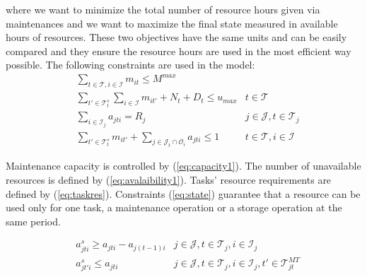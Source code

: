 \documentclass[a4paper,onecolumn,fleqn]{article}
\begin{document}
    where we want to minimize the total number of resource hours given via maintenances and we want to maximize the final state measured in available hours of resources. These two objectives have the same units and can be easily compared and they ensure the resource hours are used in the most efficient way possible.
    The following constraints are used in the model:       
    \begin{align}
        & \sum_{t \in \mathcal{T}, i \in \mathcal{I}} m_{it} \leq M^{max} \label{eq:capacity1}\\
       & \sum_{t' \in \mathcal{T}^{s}_t} \sum_{i \in \mathcal{I}} m_{it'} + N_t + D_t\leq u_{max} 
        &t \in \mathcal{T} \label{eq:avalaibility1}\\
        & \sum_{i \in \mathcal{I}_j} a_{jti} = R_j
                & j \in \mathcal{J}, t \in \mathcal{T}_j  \label{eq:taskres}\\
        & \sum_{t' \in \mathcal{T}^{s}_t} m_{it'} + \sum_{j \in \mathcal{J}_t \cap \mathcal{O}_i} a_{jti} \leq 1 
                & t \in \mathcal{T}, i \in \mathcal{I} \label{eq:state}
    \end{align}


    Maintenance capacity is controlled by (\ref{eq:capacity1}). The number of unavailable resources is defined by (\ref{eq:avalaibility1}). Tasks' resource requirements are defined by (\ref{eq:taskres}). Constraints (\ref{eq:state}) guarantee that a resource can be used only for one task, a maintenance operation or a storage operation at the same period.  

    \begin{align}
        & a^s_{jti} \geq a_{jti} - a_{j(t-1)i} 
                & j \in \mathcal{J}, t \in \mathcal{T}_j, i \in \mathcal{I}_j \label{eq:start1} \\
        & a^s_{jt'i} \leq a_{jti}
        & j \in \mathcal{J}, t \in \mathcal{T}_j, i \in \mathcal{I}_j, t' \in \mathcal{T}^{MT}_{jt} \label{eq:start2}
    \end{align}
\end{document}

